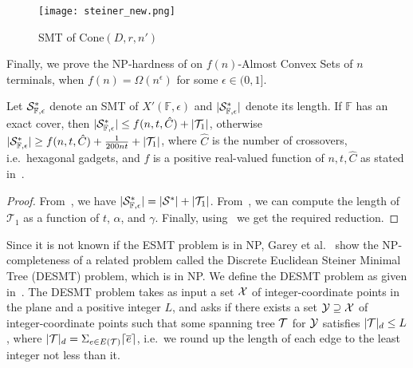 \begin{figure}[h]
\centering
\texttt{[image: steiner\_new.png]}
\caption{SMT of $\mathrm{Cone}(D,r,n')$}
\label{fig:steiner_new}
\end{figure}
Finally, we prove the NP-hardness of \ESMT on $f(n)$-Almost Convex Sets of $n$ terminals, when $f(n) = \Omega(n^\epsilon)$ for some $\epsilon \in (0,1]$.
\begin{theorem}\label{thm:redn_final}
    Let $\mathcal{S}^{*}_{\mathbb{F},\epsilon}$ denote an SMT of $X'(\mathbb{F},\epsilon)$ and $|\mathcal{S}^*_{\mathbb{F},\epsilon}|$ denote its length. If $\mathbb{F}$ has an exact cover, then $|\mathcal{S}^{*}_{\mathbb{F},\epsilon}| \leq f(n,t,\hat{C}) + |\mathcal{T}_1|$, otherwise $|\mathcal{S}^{*}_{\mathbb{F},\epsilon}| \geq f(n,t,\hat{C}) + \frac{1}{200nt} + |\mathcal{T}_1|$, where $\hat{C}$ is the number of crossovers, i.e.~hexagonal gadgets, and $f$ is a positive real-valued function of $n,t,\hat{C}$ as stated in~.
\end{theorem}

\begin{proof}
    From~, we have $|\mathcal{S}^{*}_{\mathbb{F},\epsilon}| = |\mathcal{S}^{*}| + |\mathcal{T}_1|$. From~, we can compute the length of $\mathcal{T}_1$ as a function of $t$, $\alpha$, and $\gamma$. Finally, using~ we get the required reduction.
\end{proof}




Since it is not known if the ESMT problem is in NP, Garey et al.~\cite{garey1977complexity} show the NP-completeness of a related problem called the {\sc Discrete Euclidean Steiner Minimal Tree} (DESMT) problem, which is in NP. We define the DESMT problem as given in~\cite{garey1977complexity}. The DESMT problem takes as input a set $\mathcal{X}$ of integer-coordinate points in the plane and a positive integer $L$, and asks if there exists a set $\mathcal{Y} \supseteq \mathcal{X}$ of integer-coordinate points such that some spanning tree $\mathcal{T}$ for $\mathcal{Y}$ satisfies $|\mathcal{T}|_d \leq L$, where $|\mathcal{T}|_d = \Sigma_{e \in E(\mathcal T)} \lceil\overline{e}\rceil$, i.e.~we round up the length of each edge to the least integer not less than it.

